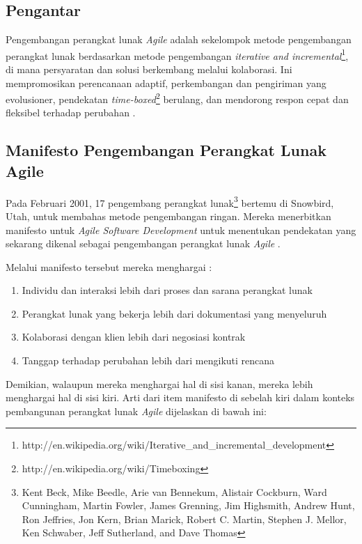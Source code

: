 \documentclass[a4paper, 12pt, oneside]{report}
\begin{document}
\subsection{Pengantar}
\onehalfspacing Pengembangan perangkat lunak \textit{Agile} adalah sekelompok metode pengembangan perangkat lunak berdasarkan metode pengembangan \textit{iterative and incremental}\footnote{http://en.wikipedia.org/wiki/Iterative\_and\_incremental\_development}, di mana persyaratan dan solusi berkembang melalui kolaborasi. Ini mempromosikan perencanaan adaptif, perkembangan dan pengiriman yang evolusioner, pendekatan \textit{time-boxed}\footnote{http://en.wikipedia.org/wiki/Timeboxing} berulang, dan mendorong respon cepat dan fleksibel terhadap perubahan \cite{agile-wikipedia}.

\subsection{Manifesto Pengembangan Perangkat Lunak Agile}

\onehalfspacing Pada Februari 2001, 17 pengembang perangkat lunak\footnote{Kent Beck, Mike Beedle, Arie van Bennekum, Alistair Cockburn, Ward Cunningham, Martin Fowler, James Grenning, Jim Highsmith, Andrew Hunt, Ron Jeffries, Jon Kern, Brian Marick, Robert C. Martin, Stephen J. Mellor, Ken Schwaber, Jeff Sutherland, and Dave Thomas} bertemu di Snowbird, Utah, untuk membahas metode pengembangan ringan. Mereka menerbitkan manifesto untuk \textit{Agile Software Development} untuk menentukan pendekatan yang sekarang dikenal sebagai pengembangan perangkat lunak \textit{Agile} \cite{agile-wikipedia}.

\onehalfspacing Melalui manifesto tersebut mereka menghargai \cite{agile-manifesto}:
\begin{enumerate}
  \item Individu dan interaksi lebih dari proses dan sarana perangkat lunak
  \item Perangkat lunak yang bekerja lebih dari dokumentasi yang menyeluruh
  \item Kolaborasi dengan klien lebih dari negosiasi kontrak
  \item Tanggap terhadap perubahan lebih dari mengikuti rencana
\end{enumerate}

\onehalfspacing Demikian, walaupun mereka menghargai hal di sisi kanan, mereka lebih menghargai hal di sisi kiri. Arti dari item manifesto di sebelah kiri dalam konteks pembangunan perangkat lunak \textit{Agile} dijelaskan di bawah ini:
\end{document}
